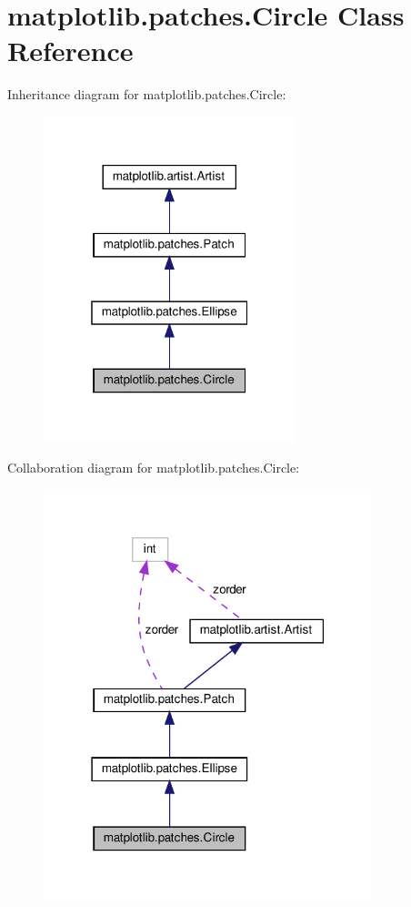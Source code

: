 \hypertarget{classmatplotlib_1_1patches_1_1Circle}{}\section{matplotlib.\+patches.\+Circle Class Reference}
\label{classmatplotlib_1_1patches_1_1Circle}


Inheritance diagram for matplotlib.\+patches.\+Circle\+:
\nopagebreak
\begin{figure}[H]
\begin{center}
\leavevmode
\includegraphics[width=208pt]{classmatplotlib_1_1patches_1_1Circle__inherit__graph}
\end{center}
\end{figure}


Collaboration diagram for matplotlib.\+patches.\+Circle\+:
\nopagebreak
\begin{figure}[H]
\begin{center}
\leavevmode
\includegraphics[width=271pt]{classmatplotlib_1_1patches_1_1Circle__coll__graph}
\end{center}
\end{figure}
